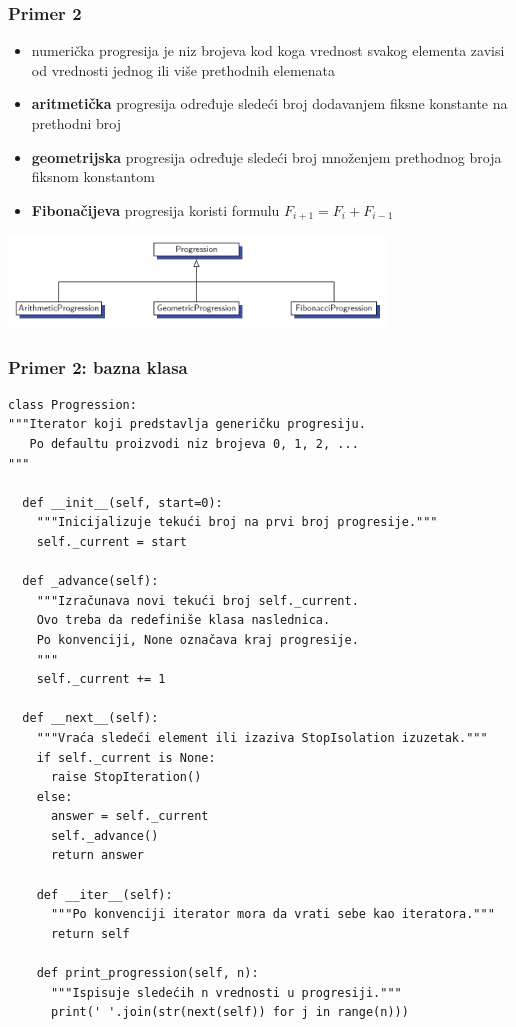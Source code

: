 \documentclass[compress]{beamer}
\begin{document}
\begin{frame}[fragile]
  \frametitle{Primer 2}
  \begin{itemize}
    \item numerička progresija je niz brojeva kod koga vrednost svakog elementa zavisi od vrednosti jednog ili više prethodnih elemenata
    \item \textbf{aritmetička} progresija određuje sledeći broj dodavanjem fiksne konstante na prethodni broj
    \item \textbf{geometrijska} progresija određuje sledeći broj množenjem prethodnog broja fiksnom konstantom
    \item \textbf{Fibonačijeva} progresija koristi formulu $F_{i+1} = F_i + F_{i-1}$
  \end{itemize}
  \begin{center}
    \includegraphics[width=10cm]{asp-03-pic05.png}
  \end{center}
\end{frame}

\begin{frame}[fragile,shrink=20]
  \frametitle{Primer 2: bazna klasa}
\begin{verbatim}
class Progression:
"""Iterator koji predstavlja generičku progresiju.
   Po defaultu proizvodi niz brojeva 0, 1, 2, ...
"""

  def __init__(self, start=0):
    """Inicijalizuje tekući broj na prvi broj progresije."""
    self._current = start
  
  def _advance(self):
    """Izračunava novi tekući broj self._current.
    Ovo treba da redefiniše klasa naslednica.
    Po konvenciji, None označava kraj progresije.
    """
    self._current += 1
    
  def __next__(self):
    """Vraća sledeći element ili izaziva StopIsolation izuzetak."""
    if self._current is None:
      raise StopIteration()
    else:
      answer = self._current
      self._advance()
      return answer
      
    def __iter__(self):
      """Po konvenciji iterator mora da vrati sebe kao iteratora."""
      return self
    
    def print_progression(self, n):
      """Ispisuje sledećih n vrednosti u progresiji."""
      print(' '.join(str(next(self)) for j in range(n)))
\end{verbatim}
\end{frame}
\end{document}
